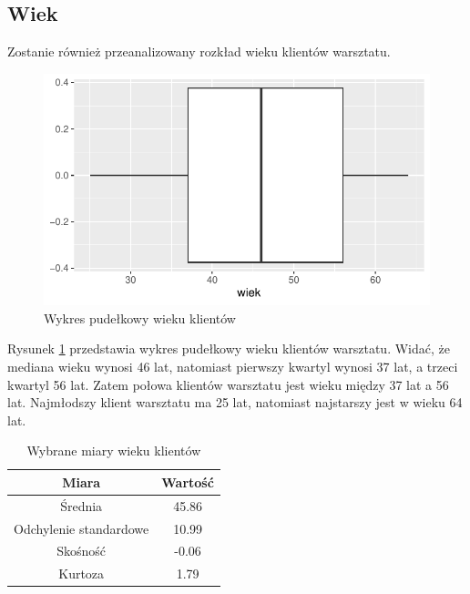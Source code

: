 \documentclass{article}\usepackage[]{graphicx}\usepackage[]{xcolor}
\makeatletter
\def\maxwidth{ %
  \ifdim\Gin@nat@width>\linewidth
    \linewidth
  \else
    \Gin@nat@width
  \fi
}
\newenvironment{knitrout}{}{} %
\makeatother
\begin{document}
\subsection{Wiek}

Zostanie również przeanalizowany rozkład wieku klientów warsztatu.





\begin{knitrout}
\color{fgcolor}\begin{figure}[H]

{\centering \includegraphics[width=\maxwidth]{figure/fig_wiek-1} 

}

\caption[Wykres pudełkowy wieku klientów]{Wykres pudełkowy wieku klientów}\label{fig:fig_wiek}
\end{figure}

\end{knitrout}

Rysunek \ref{fig:fig_wiek} przedstawia wykres pudełkowy wieku klientów warsztatu. Widać, że mediana wieku wynosi 46 lat, natomiast pierwszy kwartyl wynosi 37 lat, a trzeci kwartyl 56 lat. Zatem połowa klientów warsztatu jest wieku między 37 lat a 56 lat.
Najmłodszy klient warsztatu ma 25 lat, natomiast najstarszy jest w wieku 64 lat.



\begin{table}[H]
\centering
\begin{tabular}{c|c} \hline
Miara & Wartość \\ \hline
Średnia & 45.86 \\ 
Odchylenie standardowe & 10.99 \\
Skośność & -0.06  \\ 
Kurtoza & 1.79 \\ \hline
\end{tabular}
\caption{Wybrane miary wieku klientów}
\label{tab_wiek}
\end{table}
\end{document}
